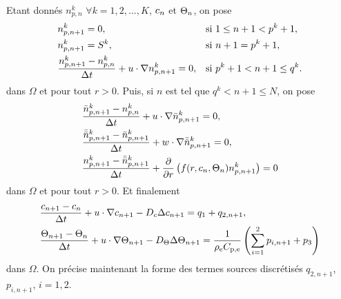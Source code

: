 Etant donnés $n_{p,n}^k$ $\forall k=1, 2, \dots, K$,
$c_n$ et $\Theta_n$, on pose
\begin{align}
  & n_{p,n+1}^k = 0, &&\text{si } 1\leq n + 1 < p^k + 1,\label{eq:splitting-np1-init}\\
  & n_{p,n+1}^k = S^k, &&\text{si } n + 1 = p^k + 1,\\
  & \frac{n_{p,n+1}^k - n_{p,n}^k}{\Delta t} + u\cdot\nabla n_{p,n+1}^k = 0, && \text{si } p^k + 1 < n+1 \leq q^k.\label{eq:splitting-np1-u}
\end{align}
dans $\Omega$ et pour tout $r > 0$. Puis, si $n$ est tel que $q^k < n
+ 1 \leq N$, on pose
\begin{align}
  &\displaystyle\frac{\bar n_{p,n+1}^k - n_{p,n}^k}{\Delta t} +
  u\cdot\nabla \bar n_{p,n+1}^k = 0,\label{eq:splitting-np2-u}\\
  &\displaystyle\frac{\bar{\bar n}_{p,n+1}^k - \bar n_{p,n+1}^k}{\Delta t} +
  w\cdot\nabla \bar{\bar n}_{p,n+1}^k = 0,\label{eq:splitting-np2-w}\\
    &\displaystyle\frac{n_{p,n+1}^k - \bar{\bar n}_{p,n+1}^k}{\Delta t} +
    \displaystyle\frac{\partial}{\partial r}\left( f(r,
      c_n, \Theta_n)n_{p,n+1}^k \right) =
    0\label{eq:splitting-dissolution}
\end{align}
dans $\Omega$ et pour tout $r > 0$. Et finalement
\begin{align}
&\frac{c_{n+1} - c_{n}}{\Delta t} + u\cdot\nabla
c_{n+1} - D_c \Delta c_{n+1} = q_1
+ q_{2,n+1},\label{eq:splitting-c} \\
&\frac{\Theta_{n+1} - \Theta_{n}}{\Delta t} + u\cdot\nabla
\Theta_{n+1} - D_\Theta \Delta \Theta_{n+1} =
\frac{1}{\rho_\mathrm{e} C_{\mathrm{p,e}}}\left( \sum_{i =
    1}^2p_{i,n+1} + p_3 \right)\label{eq:splitting-t}
\end{align}
dans $\Omega$. On précise maintenant la forme des termes sources
discrétisés $q_{2,n+1}$, $p_{i,n+1}$, $i = 1,2$.

